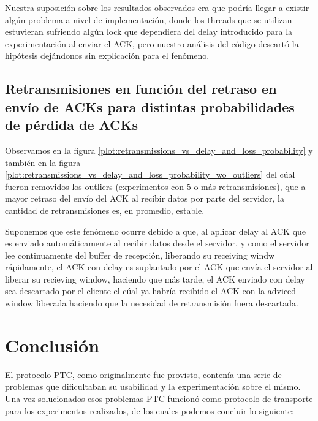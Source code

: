 \documentclass[a4paper, 10pt, twoside]{article}
\begin{document}
Nuestra suposición sobre los resultados observados era que podría llegar a existir algún problema a nivel de implementación, donde los threads que se utilizan estuvieran sufriendo algún lock que dependiera del delay introducido para la experimentación al enviar el ACK, pero nuestro análisis del código descartó la hipótesis dejándonos sin explicación para el fenómeno.


\subsection{Retransmisiones en función del retraso en envío de ACKs para distintas probabilidades de pérdida de ACKs} \label{sec:retr_vs_delay_and_loss}

Observamos en la figura \ref{plot:retransmissions_vs_delay_and_loss_probability} y también en la figura \ref{plot:retransmissions_vs_delay_and_loss_probability_wo_outliers} del cúal fueron removidos los outliers (experimentos con 5 o más retransmisiones), que a mayor retraso del envío del ACK al recibir datos por parte del servidor, la cantidad de retransmisiones es, en promedio, estable.

Suponemos que este fenómeno ocurre debido a que, al aplicar delay al ACK que es enviado automáticamente al recibir datos desde el servidor, y como el servidor lee continuamente del buffer de recepción, liberando su receiving windw rápidamente, el ACK con delay es suplantado por el ACK que envía el servidor al liberar su recieving window, haciendo que más tarde, el ACK enviado con delay sea descartado por el cliente el cúal ya habría recibido el ACK con la adviced window liberada haciendo que la necesidad de retransmisión fuera descartada.



\section{Conclusión}

El protocolo PTC, como originalmente fue provisto, contenía una serie de problemas que dificultaban su usabilidad y la experimentación sobre el mismo. Una vez solucionados esos problemas PTC funcionó como protocolo de transporte para los experimentos realizados, de los cuales podemos concluir lo siguiente:
\end{document}
